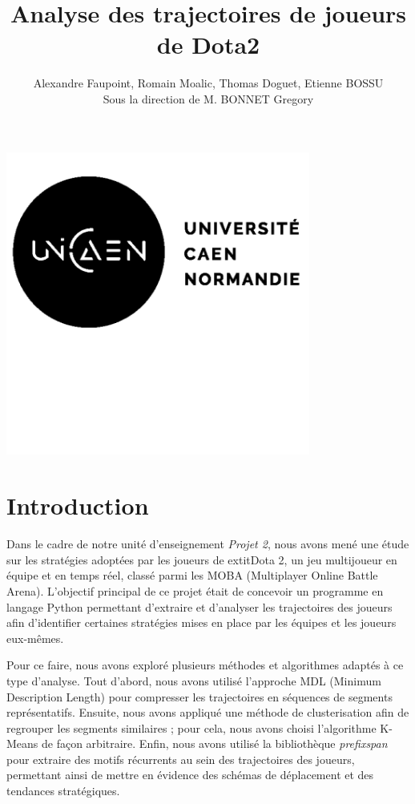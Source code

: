 \documentclass{article}
\title{Analyse des trajectoires de joueurs de Dota2}
\author{Alexandre Faupoint, Romain Moalic, Thomas Doguet, Etienne BOSSU\\ 
Sous la direction de M. BONNET Gregory}
\date
\begin{document}
    \maketitle
\begin{center}
    \includegraphics[width=10cm]{logoUnicaen.png}
    \end{center}

    \thispagestyle{empty}
    \setcounter{page}{0}

    \newpage
    
    \tableofcontents

    \newpage
    
    \section{Introduction}
   
        Dans le cadre de notre unité d'enseignement \textit{Projet 2}, nous avons mené une étude sur les stratégies adoptées par les joueurs de 	extit{Dota 2}, un jeu multijoueur en équipe et en temps réel, classé parmi les MOBA (Multiplayer Online Battle Arena). L'objectif principal de ce projet était de concevoir un programme en langage Python permettant d'extraire et d'analyser les trajectoires des joueurs afin d'identifier certaines stratégies mises en place par les équipes et les joueurs eux-mêmes.
    
        Pour ce faire, nous avons exploré plusieurs méthodes et algorithmes adaptés à ce type d'analyse. Tout d'abord, nous avons utilisé l'approche MDL (Minimum Description Length) pour compresser les trajectoires en séquences de segments représentatifs. Ensuite, nous avons appliqué une méthode de clusterisation afin de regrouper les segments similaires ; pour cela, nous avons choisi l'algorithme K-Means de façon arbitraire. Enfin, nous avons utilisé la bibliothèque \textit{prefixspan} pour extraire des motifs récurrents au sein des trajectoires des joueurs, permettant ainsi de mettre en évidence des schémas de déplacement et des tendances stratégiques.
    
\end{document}
